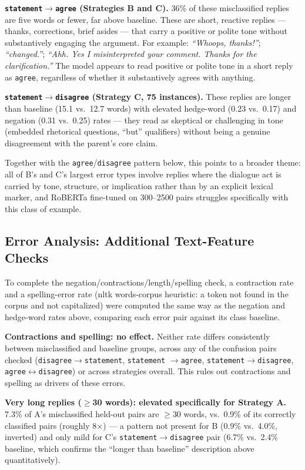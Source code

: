 \textbf{\texttt{statement}$\to$\texttt{agree} (Strategies B and C).} 36\%
of these misclassified replies are five words or fewer, far above
baseline. These are short, reactive replies --- thanks, corrections,
brief asides --- that carry a positive or polite tone without
substantively engaging the argument. For example: \emph{``Whoops,
thanks!''}; \emph{``changed.''}; \emph{``Ahh. Yes I misinterpreted your
comment. Thanks for the clarification.''} The model appears to read
positive or polite tone in a short reply as \texttt{agree}, regardless
of whether it substantively agrees with anything.

\textbf{\texttt{statement}$\to$\texttt{disagree} (Strategy C, 75
instances).} These replies are longer than baseline (15.1 vs.\ 12.7
words) with elevated hedge-word (0.23 vs.\ 0.17) and negation (0.31 vs.\
0.25) rates --- they read as skeptical or challenging in tone (embedded
rhetorical questions, ``but'' qualifiers) without being a genuine
disagreement with the parent's core claim.

Together with the \texttt{agree}/\texttt{disagree} pattern below, this
points to a broader theme: all of B's and C's largest error types
involve replies where the dialogue act is carried by tone, structure, or
implication rather than by an explicit lexical marker, and RoBERTa
fine-tuned on 300--2500 pairs struggles specifically with this class of
example.

\subsection{Error Analysis: Additional Text-Feature Checks}
\label{sec:error-textfeatures}

To complete the negation/contractions/length/spelling check, a
contraction rate and a spelling-error rate (nltk words-corpus heuristic:
a token not found in the corpus and not capitalized) were computed the
same way as the negation and hedge-word rates above, comparing each
error pair against its class baseline.

\textbf{Contractions and spelling: no effect.} Neither rate differs
consistently between misclassified and baseline groups, across any of
the confusion pairs checked
(\texttt{disagree}$\to$\texttt{statement}, \texttt{statement}
$\to$\texttt{agree}, \texttt{statement}$\to$\texttt{disagree},
\texttt{agree}$\leftrightarrow$\texttt{disagree}) or across strategies
overall. This rules out contractions and spelling as drivers of these
errors.

\textbf{Very long replies ($\geq$30 words): elevated specifically for
Strategy A.} 7.3\% of A's misclassified held-out pairs are $\geq$30
words, vs.\ 0.9\% of its correctly classified pairs (roughly 8$\times$)
--- a pattern not present for B (0.9\% vs.\ 4.0\%, inverted) and only
mild for C's \texttt{statement}$\to$\texttt{disagree} pair (6.7\% vs.\
2.4\% baseline, which confirms the ``longer than baseline'' description
above quantitatively).

